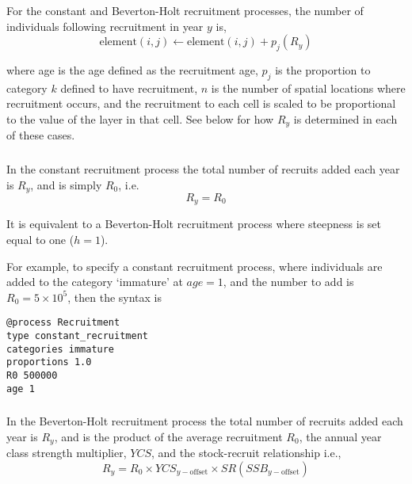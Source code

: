 For the constant and Beverton-Holt recruitment processes, the  number of individuals following recruitment in year $y$ is,  
\begin{equation}
  \text{element}(i,j) \leftarrow \text{element}(i,j) + p_j(R_y)
\end{equation}

where age is the age defined as the recruitment age, $p_j$ is the proportion to category $k$ defined to have recruitment, $n$ is the number of spatial locations where recruitment occurs, and the recruitment to each cell is scaled to be proportional to the value of the layer in that cell. See below for how $R_y$ is determined in each of these cases.

\subsubsection*{}

In the constant recruitment process the total number of recruits added each year is $R_y$, and is simply $R_0$, i.e.
\begin{equation}
  R_y = R_0
\end{equation}

It is equivalent to a Beverton-Holt recruitment process where steepness is set equal to one ($h=1$).

For example, to specify a constant recruitment process, where individuals are added to the category `immature' at $age=1$, and the number to add is $R_0=5 \times 10^5$, then the syntax is

{\small{\begin{verbatim}
@process Recruitment
type constant_recruitment
categories immature
proportions 1.0
R0 500000
age 1
\end{verbatim}}}

\subsubsection*{}

In the Beverton-Holt recruitment process the total number of recruits added each year is $R_y$, and is the product of the average recruitment $R_0$, the annual year class strength multiplier, $YCS$, and the stock-recruit relationship i.e.,
\begin{equation}
  R_y = R_0 \times YCS_{y-\text{offset}} \times SR(SSB_{y-\text{offset}})
\end{equation}
  
